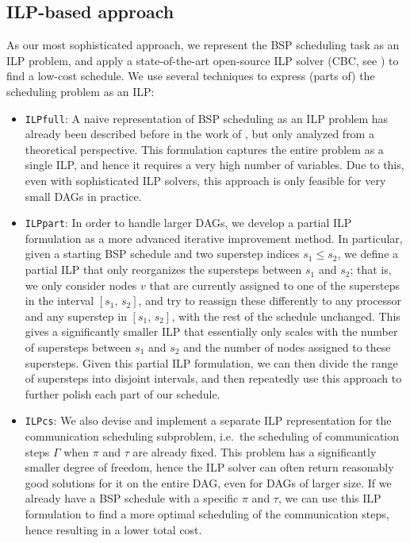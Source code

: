 \documentclass[sigconf,nonacm]{acmart}
\begin{document}
\subsection{ILP-based approach}

As our most sophisticated approach, we represent the BSP scheduling task as an ILP problem, and apply a state-of-the-art open-source ILP solver (CBC, see \cite{cbc1}) to find a low-cost schedule. We use several techniques to express (parts of) the scheduling problem as an ILP:
\begin{itemize}[topsep=2pt,itemsep=0pt,partopsep=2pt,parsep=6pt]
    \item \texttt{ILPfull}: A naive representation of BSP scheduling as an ILP problem has already been described before in the work of \cite{DAGBSP}, but only analyzed from a theoretical perspective. This formulation captures the entire problem as a single ILP, and hence it requires a very high number of variables. Due to this, even with sophisticated ILP solvers, this approach is only feasible for very small DAGs in practice.
    \item \texttt{ILPpart}: In order to handle larger DAGs, we develop a partial ILP formulation as a more advanced iterative improvement method. In particular, given a starting BSP schedule and two superstep indices $s_1 \leq s_2$, we define a partial ILP that only reorganizes the supersteps between $s_1$ and $s_2$; that is, we only consider nodes $v$ that are currently assigned to one of the supersteps in the interval $[s_1, \, s_2]$, and try to reassign these differently to any processor and any superstep in $[s_1, \, s_2]$, with the rest of the schedule unchanged. This gives a significantly smaller ILP that essentially only scales with the number of supersteps between $s_1$ and $s_2$ and the number of nodes assigned to these supersteps. Given this partial ILP formulation, we can then divide the range of supersteps into disjoint intervals, and then repeatedly use this approach to further polish each part of our schedule.
    \item \texttt{ILPcs}: We also devise and implement a separate ILP representation for the communication scheduling subproblem, i.e.\ the scheduling of communication steps $\Gamma$ when $\pi$ and $\tau$ are already fixed. This problem has a significantly smaller degree of freedom, hence the ILP solver can often return reasonably good solutions for it on the entire DAG, even for DAGs of larger size. If we already have a BSP schedule with a specific $\pi$ and $\tau$, we can use this ILP formulation to find a more optimal scheduling of the communication steps, hence resulting in a lower total cost.
\end{itemize}
\end{document}
